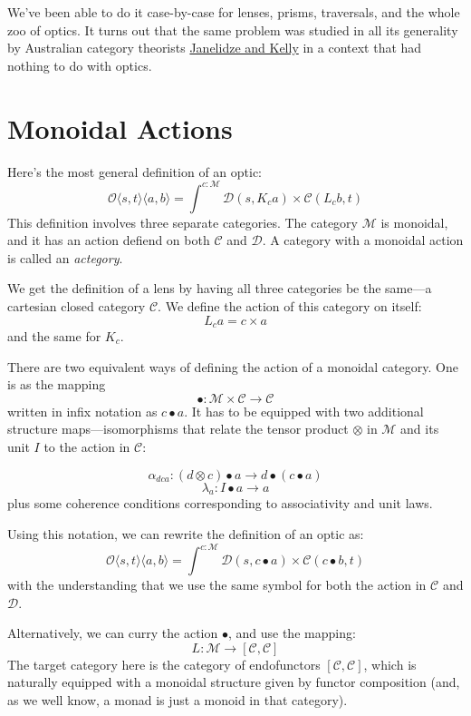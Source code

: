 \documentclass[11pt]{amsart}
\begin{document}
We've been able to do it case-by-case for lenses, prisms, traversals, and the whole zoo of optics. It turns out that the same problem was studied in all its generality by Australian category theorists \href{http://www.tac.mta.ca/tac/volumes/9/n4/n4.pdf}{Janelidze and Kelly} in a context that had nothing to do with optics.

\section{Monoidal Actions}

Here's the most general definition of an optic:
\[ \mathcal{O}\langle s, t\rangle \langle a, b \rangle = \int^{c \colon \mathcal{M}} \mathcal{D}(s, K_c a) \times  \mathcal{C}(L_c b, t) \]
This definition involves three separate categories. The category $\mathcal{M}$ is monoidal, and it has an action defiend on both $\mathcal{C}$ and $\mathcal{D}$. A category with a monoidal action is called an \emph{actegory}.

We get the definition of a lens by having all three categories be the same---a cartesian closed category $\mathcal{C}$. We define the action of this category on itself:
\[L_c a = c \times a \]
and the same for $K_c$. 

There are two equivalent ways of defining the action of a monoidal category. One is as the mapping 
\[ \bullet \colon \mathcal{M} \times \mathcal{C} \to \mathcal{C} \]
written in infix notation as $c \bullet a$. It has to be equipped with two additional structure maps---isomorphisms that relate the tensor product $\otimes$ in $\mathcal{M}$ and its unit $I$ to the action in $\mathcal{C}$:

\[ \alpha_{d c a} \colon (d \otimes c) \bullet a  \to d \bullet (c \bullet a) \]
\[ \lambda_a \colon I \bullet a \to a \]
plus some coherence conditions corresponding to associativity and unit laws. 

Using this notation, we can rewrite the definition of an optic as:
\[ \mathcal{O}\langle s, t\rangle \langle a, b \rangle = \int^{c \colon \mathcal{M}} \mathcal{D}(s, c \bullet a) \times  \mathcal{C}(c \bullet b, t) \]
with the understanding that we use the same symbol for both the action in $\mathcal{C}$ and $\mathcal{D}$.

Alternatively, we can curry the action $\bullet$, and use the mapping:
\[ L \colon \mathcal{M} \to [\mathcal{C}, \mathcal{C}] \]
The target category here is the category of endofunctors $[\mathcal{C}, \mathcal{C}]$, which is naturally equipped with a monoidal structure given by functor composition (and, as we well know, a monad is just a monoid in that category). 
\end{document}
